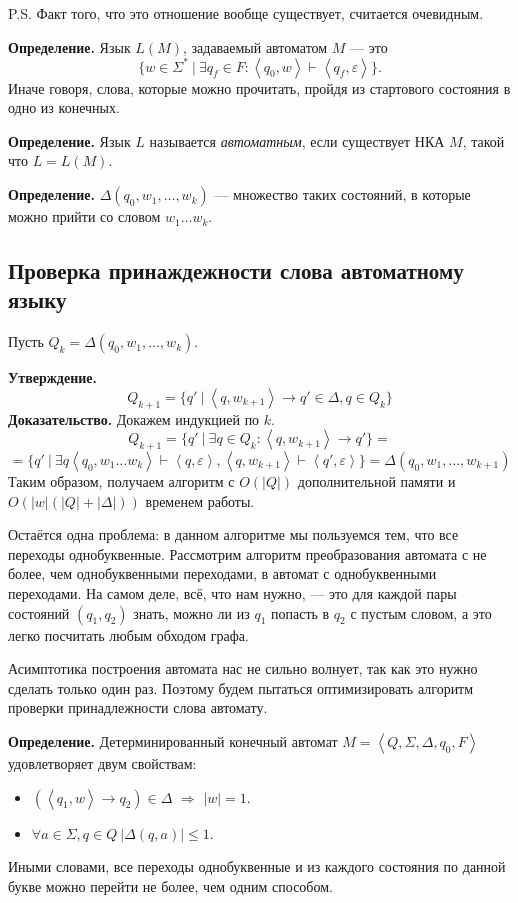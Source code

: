 P.S. Факт того, что это отношение вообще существует, считается очевидным.

\textbf{Определение.} Язык $L(M)$, задаваемый автоматом $M$ --- это
\[
    \{w \in \Sigma^*~|~ \exists q_f \in F: \left<q_0, w \right> \vdash \left<q_f, \varepsilon \right>\}.
\]
Иначе говоря, слова, которые можно прочитать, пройдя из стартового состояния в одно из конечных.

\textbf{Определение.} Язык $L$ называется \textit{автоматным}, если существует НКА $M$, такой что $L = L(M)$.

\textbf{Определение.} $\Delta(q_0, w_1, \dots, w_k)$ --- множество таких состояний, в которые можно прийти со словом $w_1 \dots w_k$.

\subsection{Проверка принаждежности слова автоматному языку}
Пусть $Q_k = \Delta(q_0, w_1, \dots, w_k)$.

\textbf{Утверждение.}
\[
    Q_{k+1} = \{q'~|~\left<q, w_{k+1} \right> \to q' \in \Delta, q \in Q_k\}
\]
\textbf{Доказательство.} Докажем индукцией по $k$.
\[
    Q_{k+1} = \{q'~|~\exists q \in Q_k: \left<q, w_{k+1} \right> \to q'\} =
\]
\[
    = \{q'~|~\exists q \left<q_0, w_1 \dots w_k \right> \vdash \left< q, \varepsilon \right>, \left< q, w_{k+1} \right> \vdash \left< q', \varepsilon \right> \} = \Delta(q_0, w_1, \dots, w_{k+1})
\]
Таким образом, получаем алгоритм с $O(|Q|)$ дополнительной памяти и $O(|w| (|Q| + |\Delta|))$ временем работы.

\QED

Остаётся одна проблема: в данном алгоритме мы пользуемся тем, что все переходы однобуквенные. 
Рассмотрим алгоритм преобразования автомата с не более, чем однобуквенными переходами, в автомат с однобуквенными переходами.
На самом деле, всё, что нам нужно, --- это для каждой пары состояний $(q_1, q_2)$ знать, можно ли из $q_1$ попасть в $q_2$ с пустым словом, а это легко посчитать любым обходом графа.

Асимптотика построения автомата нас не сильно волнует, так как это нужно сделать только один раз.
Поэтому будем пытаться оптимизировать алгоритм проверки принадлежности слова автомату.

\textbf{Определение.} Детерминированный конечный автомат $M = \left< Q, \Sigma, \Delta, q_0, F \right>$ удовлетворяет двум свойствам:
\begin{itemize}
    \item $(\left< q_1, w \right> \to q_2) \in \Delta$ $\Rightarrow$ $|w| = 1$.
    \item $\forall a \in \Sigma, q \in Q~|\Delta(q, a)| \le 1$.
\end{itemize}
Иными словами, все переходы однобуквенные и из каждого состояния по данной букве можно перейти не более, чем одним способом.

